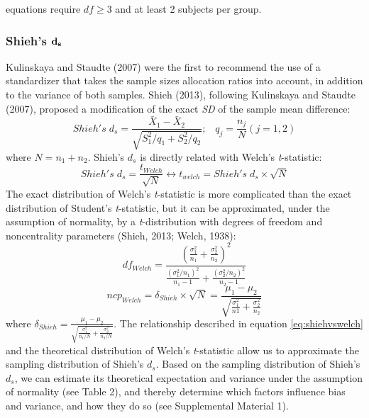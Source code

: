 \documentclass[
  english,
  man,floatsintext]{apa6}
\begin{document}
\begin{landscape}
equations require \(df \ge 3\) and at least 2 subjects per group.

\end{landscape}
\newpage

\hypertarget{shiehs-bf-d_s}{%
\subsubsection{\texorpdfstring{Shieh's \(\bf d_s\)}{Shieh's \textbackslash bf d\_s}}\label{shiehs-bf-d_s}}

Kulinskaya and Staudte (2007) were the first to recommend the use of a standardizer that takes the sample sizes allocation ratios into account, in addition to the variance of both samples. Shieh (2013), following Kulinskaya and Staudte (2007), proposed a modification of the exact \emph{SD} of the sample mean difference:
\begin{equation*} 
Shieh's \; d_s = \frac{\bar{X}_1 - \bar{X}_2}{\sqrt{S_1^2/q_1+S_2^2/q_2}}; \;\;\; q_j=\frac{n_j}{N} (j=1,2)
\label{eq:Shiehds}
\end{equation*}
where \(N = n_1+n_2\). Shieh's \(d_{s}\) is directly related with Welch's \emph{t}-statistic:
\begin{equation} 
Shieh's \; d_s=\frac{t_{Welch}}{\sqrt{N}}\leftrightarrow t_{welch} = Shieh's \; d_s \times \sqrt{N}
\label{eq:shiehvswelch}
\end{equation}
The exact distribution of Welch's \emph{t}-statistic is more complicated than the exact distribution of Student's \emph{t}-statistic, but it can be approximated, under the assumption of normality, by a \emph{t}-distribution with degrees of freedom and noncentrality parameters (Shieh, 2013; Welch, 1938):
\begin{equation} 
df_{Welch} = \frac{\left(\frac{\sigma^2_1}{n_1}+\frac{\sigma^2_2}{n_2} \right)^2}{\frac{(\sigma^2_1/n_1)^2}{n_1-1}+\frac{(\sigma^2_2/n_2)^2}{n_2-1}}
\label{eq:welchdf}
\end{equation}
\begin{equation*} 
ncp_{Welch} = \delta_{Shieh} \times \sqrt{N} = \frac{\mu_1-\mu_2}{\sqrt{\frac{\sigma_1^2}{n1}+\frac{\sigma_2^2}{n_2}}}
\label{eq:welchncp}
\end{equation*}
where \(\delta_{Shieh}=\frac{\mu_1-\mu_2}{\sqrt{\frac{\sigma_1^2}{n_1/N}+\frac{\sigma_2^2}{n_2/N}}}\). The relationship described in equation \ref{eq:shiehvswelch} and the theoretical distribution of Welch's \emph{t}-statistic allow us to approximate the sampling distribution of Shieh's \(d_s\). Based on the sampling distribution of Shieh's \(d_s\), we can estimate its theoretical expectation and variance under the assumption of normality (see Table 2), and thereby determine which factors influence bias and variance, and how they do so (see Supplemental Material 1).
\end{document}

